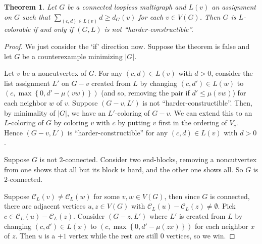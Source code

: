 \documentclass[12pt]{amsart}
\theoremstyle{plain}
\newtheorem{thm}{Theorem}
\theoremstyle{definition}
\theoremstyle{remark}
\newcommand{\fancy}[1]{\mathcal{#1}}
\newcommand{\C}{\fancy{C}}
\newcommand{\set}[1]{\left\{ #1 \right\}}
\newcommand{\card}[1]{\left|#1\right|}
\begin{document}
\begin{thm}
Let $G$ be a connected loopless multigraph and $L(v)$ an assignment on $G$ such that $\sum_{(c,d) \in L(v)} d \ge d_G(v)$ for each $v \in V(G)$.  Then $G$ is $L$-colorable if and only if $(G,L)$ is not ``harder-constructible''.
\end{thm}
\begin{proof}
We just consider the `if' direction now.  Suppose the theorem is false and let $G$ be a counterexample minimizing $\card{G}$.

Let $v$ be a noncutvertex of $G$.  For any $(c,d) \in L(v)$ with $d > 0$, consider the list assignment $L'$ on $G-v$ created from $L$ by changing $(c, d') \in L(w)$ to $(c, \max\set{0,d' - \mu(vw)})$ (and so, removing the pair if $d' \le \mu(vw)$) for each neighbor $w$ of $v$.  Suppose $(G-v, L')$ is not ``harder-constructible''.  Then, by minimality of $|G|$, we have an $L'$-coloring of $G-v$.  We can extend this to an $L$-coloring of $G$ by coloring $v$ with $c$ by putting $v$ first in the ordering of $V_c$.  Hence $(G-v, L')$ is ``harder-constructible'' for any $(c,d) \in L(v)$ with $d > 0$.

Suppose $G$ is not $2$-connected.  Consider two end-blocks, removing a noncutvertex from one shows that all but its block is hard, and the other one shows all.  So $G$ is $2$-connected.

Suppose $\C_L(v) \ne \C_L(w)$ for some $v, w \in V(G)$, then since $G$ is connected, there are adjacent vertices $u,z \in V(G)$ with $\C_L(u) - \C_L(z) \ne \emptyset$.  Pick $c \in \C_L(u) - \C_L(z)$.  Consider $(G-z, L')$ where $L'$ is created from $L$ by changing $(c, d') \in L(x)$ to $(c, \max\set{0,d' - \mu(zx)})$ for each neighbor $x$ of $z$.  Then $u$ is a $+1$ vertex while the rest are still $0$ vertices, so we win.



\end{proof}



\end{document}
